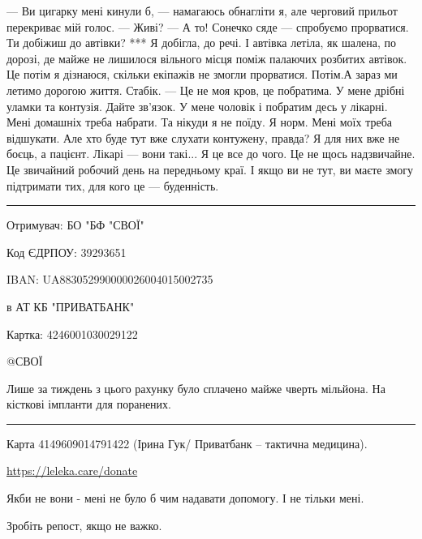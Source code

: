 — Ви цигарку мені кинули б, — намагаюсь обнагліти я, але черговий прильот перекриває  мій голос. 
— Живі?
— А то! Сонечко сяде — спробуємо прорватися. Ти добіжиш до автівки? 
***
Я добігла, до речі.  І автівка летіла, як шалена, по дорозі, де майже не лишилося вільного місця поміж палаючих розбитих автівок. Це потім я дізнаюся, скільки екіпажів не змогли прорватися. Потім.А зараз ми летимо дорогою життя. 
Стабік. 
— Це не моя кров, це побратима. У мене дрібні уламки та контузія. Дайте зв'язок. У мене чоловік і побратим  десь у лікарні. Мені домашніх треба набрати. Та нікуди я не поїду. Я норм. Мені моїх треба відшукати. 
Але хто буде тут вже слухати контужену, правда? Я для них   вже не боєць, а пацієнт. Лікарі — вони такі... 
Я це все до чого. Це не щось надзвичайне. Це звичайний робочий день на передньому краї. І якщо ви не тут, ви маєте змогу підтримати тих, для кого це — буденність.

\par\noindent\rule{\textwidth}{0.4pt}

Отримувач: БО "БФ "СВОЇ"\par
Код ЄДРПОУ: 39293651\par
IBAN: UA883052990000026004015002735\par
в АТ КБ "ПРИВАТБАНК"\par
Картка: 4246001030029122\par
@СВОЇ\par

Лише за тиждень з цього рахунку було сплачено майже чверть мільйона. На
кісткові імпланти для поранених. 

\par\noindent\rule{\textwidth}{0.4pt}

Карта 4149609014791422 (Ірина Гук/ Приватбанк – тактична медицина).

\url{https://leleka.care/donate}

Якби не вони - мені не було б чим надавати допомогу. І не тільки мені.

Зробіть репост, якщо не важко.
